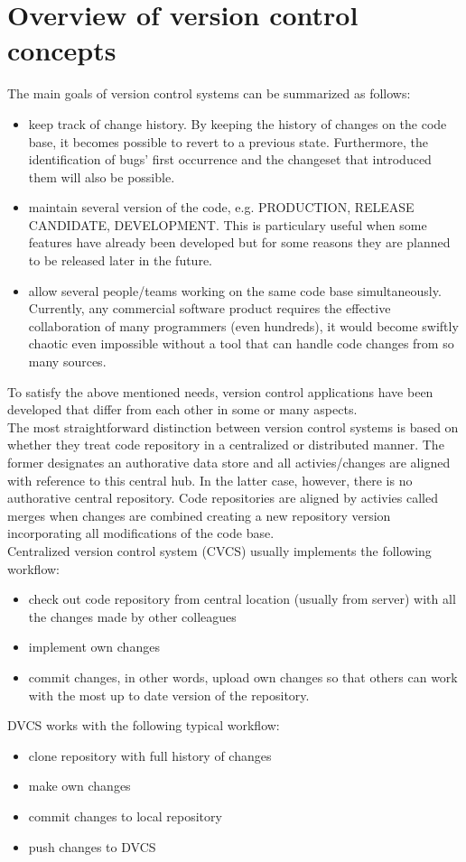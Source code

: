 \section{Overview of version control concepts}
The main goals of version control systems can be summarized as follows:
\begin{itemize}
    \item keep track of change history. By keeping the history of changes on the code base, it becomes possible to revert
    to a previous state. Furthermore, the identification of bugs' first occurrence and the changeset that introduced them
    will also be possible.
    \item maintain several version of the code, e.g. PRODUCTION, RELEASE CANDIDATE, DEVELOPMENT. This is particulary
    useful when some features have already been developed but for some reasons they are planned to be released later in 
    the future.
    \item allow several people/teams working on the same code base simultaneously. Currently, any commercial software
    product requires the effective collaboration of many programmers (even hundreds), it would become swiftly chaotic
    even impossible without a tool that can handle code changes from so many sources.
\end{itemize}
To satisfy the above mentioned needs, version control applications have been developed that differ from each other in
some or many aspects. \\
The most straightforward distinction between version control systems is based on whether they treat code repository in 
a centralized or distributed manner. The former designates an authorative data store and all activies/changes are 
aligned with reference to this central hub. In the latter case, however, there is no authorative central repository.
Code repositories are aligned by activies called merges when changes are combined creating a new repository version 
incorporating all modifications of the code base. \\
Centralized version control system (CVCS) usually implements the following workflow:
\begin{itemize}
    \item check out code repository from central location (usually from server) with all the changes made by other
    colleagues
    \item implement own changes
    \item commit changes, in other words, upload own changes so that others can work with the most up to date version of
    the repository.
\end{itemize}
DVCS works with the following typical workflow:
\begin{itemize}
    \item clone repository with full history of changes
    \item make own changes
    \item commit changes to local repository
    \item push changes to DVCS
\end{itemize}
